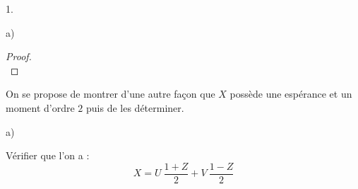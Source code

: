 \documentclass[11pt]{article}%
\begin{document}
\begin{noliste}{1.}
\begin{noliste}{a)}
\begin{proof}
      ~\\[-1.2cm]
    \end{proof}    
  \end{noliste}


  
\item On se propose de montrer d'une autre façon que $X$ possède une
  espérance et un moment d'ordre $2$ puis de les déterminer.

  \begin{noliste}{a)}
    \setlength{\itemsep}{2mm}
  \item Vérifier que l'on a :
    \[
    X = U \ \dfrac{1 + Z}{2} + V \ \dfrac{1-Z}{2}
    \]    


\end{noliste}
\end{noliste}
\end{document}
